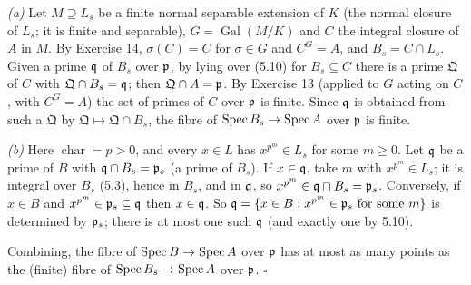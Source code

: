 \documentclass[11pt]{article}
\begin{document}
\emph{(a)} Let $M\supseteq L_s$ be a finite normal separable extension of $K$ (the normal closure of $L_s$; it is finite and separable), $G=\operatorname{Gal}(M/K)$ and $C$ the integral closure of $A$ in $M$. By Exercise 14, $\sigma(C)=C$ for $\sigma\in G$ and $C^G=A$, and $B_s=C\cap L_s$. Given a prime $\mathfrak q$ of $B_s$ over $\mathfrak p$, by lying over (5.10) for $B_s\subseteq C$ there is a prime $\mathfrak Q$ of $C$ with $\mathfrak Q\cap B_s=\mathfrak q$; then $\mathfrak Q\cap A=\mathfrak p$. By Exercise 13 (applied to $G$ acting on $C$, with $C^G=A$) the set of primes of $C$ over $\mathfrak p$ is finite. Since $\mathfrak q$ is obtained from such a $\mathfrak Q$ by $\mathfrak Q\mapsto\mathfrak Q\cap B_s$, the fibre of $\operatorname{Spec} B_s\to\operatorname{Spec} A$ over $\mathfrak p$ is finite.

\emph{(b)} Here $\operatorname{char}=p>0$, and every $x\in L$ has $x^{p^m}\in L_s$ for some $m\ge0$. Let $\mathfrak q$ be a prime of $B$ with $\mathfrak q\cap B_s=\mathfrak p_s$ (a prime of $B_s$). If $x\in\mathfrak q$, take $m$ with $x^{p^m}\in L_s$; it is integral over $B_s$ (5.3), hence in $B_s$, and in $\mathfrak q$, so $x^{p^m}\in\mathfrak q\cap B_s=\mathfrak p_s$. Conversely, if $x\in B$ and $x^{p^m}\in\mathfrak p_s\subseteq\mathfrak q$ then $x\in\mathfrak q$. So $\mathfrak q=\{x\in B:x^{p^m}\in\mathfrak p_s\text{ for some }m\}$ is determined by $\mathfrak p_s$; there is at most one such $\mathfrak q$ (and exactly one by 5.10).

Combining, the fibre of $\operatorname{Spec} B\to\operatorname{Spec} A$ over $\mathfrak p$ has at most as many points as the (finite) fibre of $\operatorname{Spec} B_s\to\operatorname{Spec} A$ over $\mathfrak p$. \hfill$\square$
\end{document}
